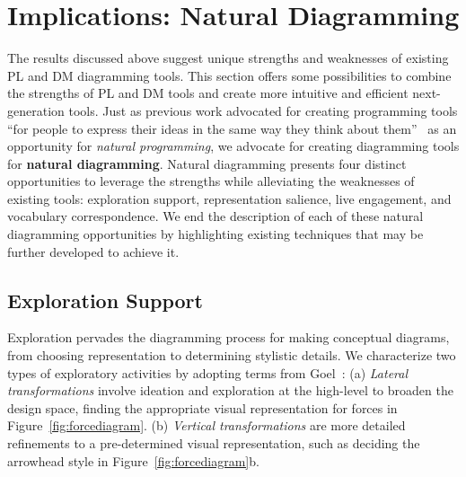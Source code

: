 
    


\section{Implications: Natural Diagramming}
\label{sec:natural-diagramming}

The results discussed above suggest unique strengths and weaknesses of existing PL and DM diagramming tools. This section offers some possibilities to combine the strengths of PL and DM tools and create more intuitive and efficient next-generation tools. Just as previous work advocated for creating programming tools ``for people to express their ideas in the same way they think about them''~\cite{myers_natural_2004} as an opportunity for \emph{natural programming}, we advocate for creating diagramming tools for \textbf{natural diagramming}. Natural diagramming presents four distinct opportunities to leverage the strengths while alleviating the weaknesses of existing tools: exploration support, representation salience, live engagement, and vocabulary correspondence. We end the description of each of these natural diagramming opportunities by highlighting existing techniques that may be further developed to achieve it. 

\subsection{Exploration Support}

Exploration pervades the diagramming process for making conceptual diagrams, from choosing representation to determining stylistic details. We characterize two types of exploratory activities by adopting terms from Goel~\cite{sketchesOfThought}: (a) \emph{Lateral transformations} involve ideation and exploration at the high-level to broaden the design space, \eg{} finding the appropriate visual representation for forces in Figure~\ref{fig:forcediagram}. (b) \emph{Vertical transformations} 
 are more detailed refinements to a pre-determined visual representation, such as deciding the arrowhead style in Figure~\ref{fig:forcediagram}b.

